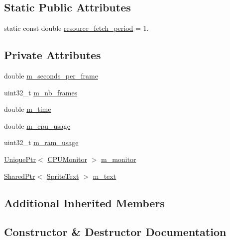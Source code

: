 \subsection*{Static Public Attributes}
\begin{DoxyCompactItemize}
\item 
static const double \hyperlink{classmage_1_1_stats_script_acae1ac4fd880389c88818a8f72cbff2b}{resource\+\_\+fetch\+\_\+period} = 1.
\end{DoxyCompactItemize}
\subsection*{Private Attributes}
\begin{DoxyCompactItemize}
\item 
double \hyperlink{classmage_1_1_stats_script_a2ab46c9b9f153822f6a9cfa721cbe0da}{m\+\_\+seconds\+\_\+per\+\_\+frame}
\item 
uint32\+\_\+t \hyperlink{classmage_1_1_stats_script_ae0c904d5b3406a20892978a83bf2fa8c}{m\+\_\+nb\+\_\+frames}
\item 
double \hyperlink{classmage_1_1_stats_script_a69972949fb34f0368e9437a254a79643}{m\+\_\+time}
\item 
double \hyperlink{classmage_1_1_stats_script_ae10409f1268280ed8b6f78ef23b87c5e}{m\+\_\+cpu\+\_\+usage}
\item 
uint32\+\_\+t \hyperlink{classmage_1_1_stats_script_a2874d123662ab2aabe28c1cf70d8f15d}{m\+\_\+ram\+\_\+usage}
\item 
\hyperlink{namespacemage_a8c307fbcc33bce9b7f2aa4c26c3b95cf}{Unique\+Ptr}$<$ \hyperlink{classmage_1_1_c_p_u_monitor}{C\+P\+U\+Monitor} $>$ \hyperlink{classmage_1_1_stats_script_a12e321d8fe1003de3643c4b799dd4c8f}{m\+\_\+monitor}
\item 
\hyperlink{namespacemage_a1e01ae66713838a7a67d30e44c67703e}{Shared\+Ptr}$<$ \hyperlink{classmage_1_1_sprite_text}{Sprite\+Text} $>$ \hyperlink{classmage_1_1_stats_script_a35bb45baabf290be684c8b67f30feeb7}{m\+\_\+text}
\end{DoxyCompactItemize}
\subsection*{Additional Inherited Members}


\subsection{Constructor \& Destructor Documentation}
\hypertarget{classmage_1_1_stats_script_a5d2042950a17b62004adead100eb07e1}{}\label{classmage_1_1_stats_script_a5d2042950a17b62004adead100eb07e1} 
